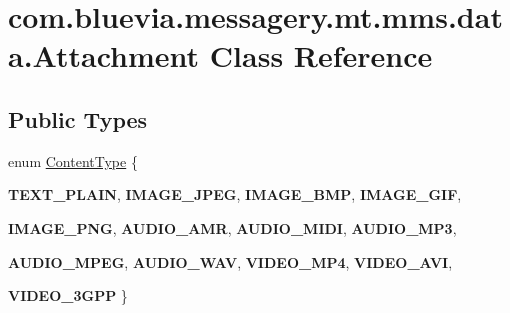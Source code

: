 \hypertarget{classcom_1_1bluevia_1_1messagery_1_1mt_1_1mms_1_1data_1_1Attachment}{
\section{com.bluevia.messagery.mt.mms.data.Attachment Class Reference}
\label{classcom_1_1bluevia_1_1messagery_1_1mt_1_1mms_1_1data_1_1Attachment}
}
\subsection*{Public Types}
\begin{DoxyCompactItemize}
\item 
enum \hyperlink{classcom_1_1bluevia_1_1messagery_1_1mt_1_1mms_1_1data_1_1Attachment_a8f358da00c8e4c63375fdd64eb698ff2}{ContentType} \{ \par
{\bfseries TEXT\_\-PLAIN}, 
{\bfseries IMAGE\_\-JPEG}, 
{\bfseries IMAGE\_\-BMP}, 
{\bfseries IMAGE\_\-GIF}, 
\par
{\bfseries IMAGE\_\-PNG}, 
{\bfseries AUDIO\_\-AMR}, 
{\bfseries AUDIO\_\-MIDI}, 
{\bfseries AUDIO\_\-MP3}, 
\par
{\bfseries AUDIO\_\-MPEG}, 
{\bfseries AUDIO\_\-WAV}, 
{\bfseries VIDEO\_\-MP4}, 
{\bfseries VIDEO\_\-AVI}, 
\par
{\bfseries VIDEO\_\-3GPP}
 \}
\end{DoxyCompactItemize}
